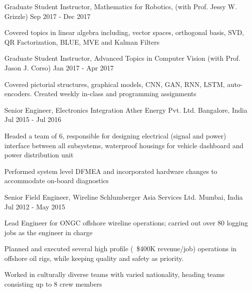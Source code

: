 \begin{cventries}
  \cventry
	{Graduate Student Instructor, Mathematics for Robotics, (with Prof. Jessy W. Grizzle)} %
	{} %
	{} %
	{Sep 2017 - Dec 2017} %
	{
		\begin{cvitems} %
			\item {Covered topics in linear algebra including, vector spaces, orthogonal basis, SVD, QR Factorization, BLUE, MVE and Kalman Filters}
		\end{cvitems}
	}
  \cventry
	{Graduate Student Instructor, Advanced Topics in Computer Vision (with Prof. Jason J. Corso)} %
	{} %
	{} %
	{Jan 2017 - Apr	 2017} %
	{
		\begin{cvitems} %
			\item {Covered pictorial structures, graphical models, CNN, GAN, RNN, LSTM, auto-encoders. Created weekly in-class and programming assignments}
		\end{cvitems}
	}      
\vspace{0.4cm}
  \cventry
    {Senior Engineer, Electronics Integration} %
    {Ather Energy Pvt. Ltd.} %
    {Bangalore, India} %
    {Jul 2015 - Jul 2016} %
    {
      \begin{cvitems} %
        \item{Headed a team of 6, responsible for designing electrical (signal and power) interface between all subsystems, waterproof housings for vehicle dashboard and power distribution unit}
        \item {Performed system level DFMEA and incorporated hardware changes to accommodate on-board diagnostics}
      \end{cvitems}
    }

  \cventry
	{Senior Field Engineer, Wireline} %
	{Schlumberger Asia Services Ltd.} %
	{Mumbai, India} %
	{Jul 2012 - May 2015} %
	{
		\begin{cvitems} %
			\item{Lead Engineer for ONGC offshore wireline operations; carried out over 80 logging jobs as the engineer in charge}
			\item {Planned and executed several high profile (~\$400K revenue/job) operations in offshore oil rigs, while keeping quality and safety as priority.}
			\item {Worked in culturally diverse teams with varied nationality, heading teams consisting up to 8 crew members}
		\end{cvitems}
	}
\vspace{-4mm}

\end{cventries}
